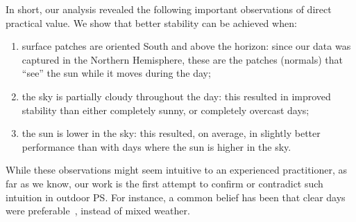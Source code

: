 
In short, our analysis revealed the following important observations of direct practical value. We show that better stability can be achieved when:
\begin{enumerate}[nosep]
    \item surface patches are oriented South and above the horizon: since our data was captured in the Northern Hemisphere, these are the patches (normals) that ``see'' the sun while it moves during the day;
    \item the sky is partially cloudy throughout the day: this resulted in improved stability than either completely sunny, or completely overcast days;
    \item the sun is lower in the sky: this resulted, on average, in slightly better performance than with days where the sun is higher in the sky.
\end{enumerate}
While these observations might seem intuitive to an experienced practitioner, as far as we know, our work is the first attempt to confirm or contradict such intuition in outdoor PS. For instance, a common belief has been that clear days were preferable~\cite{yu-iccp-13,inose-tcva-13,ackermann-cvpr-12,abrams-eccv-12}, instead of mixed weather.

